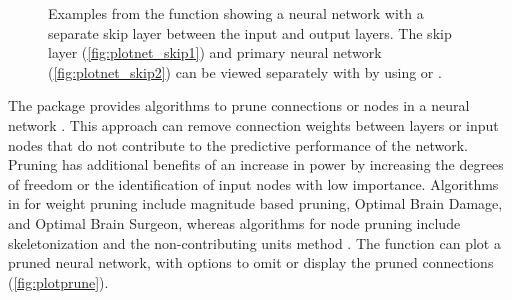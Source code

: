 \documentclass[article,shortnames]{jss}
\begin{document}
\begin{figure}[!ht]
\caption{Examples from the  function showing a neural network with a separate skip layer between the input and output layers.  The skip layer (\ref{fig:plotnet_skip1}) and primary neural network (\ref{fig:plotnet_skip2}) can be viewed separately with  by using  or .}
\label{fig:plotnet_skip}
\end{figure}

The  package provides algorithms to prune connections or nodes in a neural network \citep{Bergmeir12}.  This approach can remove connection weights between layers or input nodes that do not contribute to the predictive performance of the network.  Pruning has additional benefits of an increase in power by increasing the degrees of freedom or the identification of input nodes with low importance.  Algorithms in  for weight pruning include magnitude based pruning, Optimal Brain Damage, and Optimal Brain Surgeon, whereas algorithms for node pruning include skeletonization and the non-contributing units method \citep{Zell98}.  The  function can plot a pruned neural network, with options to omit or display the pruned connections (\cref{fig:plotprune}).  
\end{document}
